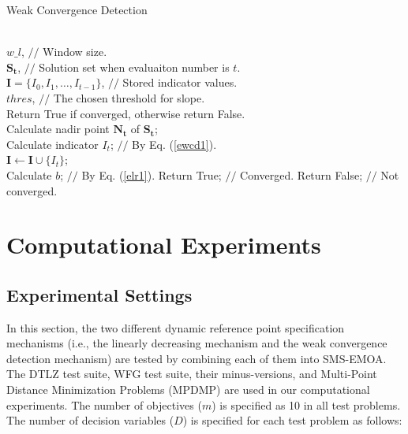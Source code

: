 \documentclass[conference]{IEEEtran}
\begin{document}
\begin{algorithm}
  \caption{Weak Convergence Detection}
  \label{alg:wcd}
  \begin{algorithmic}
  \REQUIRE ~~\\
    $w\_l$, $//$ Window size.\\
    $\boldsymbol{S_{t}}$, $//$ Solution set when evaluaiton number is $t$.\\
    $\boldsymbol I = \{I_{0},I_{1},\dots,I_{t-1}\}$, $//$ Stored indicator values. \\
    $thres$, $//$ The chosen threshold for slope. \\ 
  \ENSURE Return True if converged, otherwise return False.~~\\
    Calculate nadir point $\boldsymbol{N_{t}}$ of $\boldsymbol{S_{t}}$; \\
    Calculate indicator $I_{t}$; $//$ By Eq. (\ref{ewcd1}). \\
    $\boldsymbol I \gets \boldsymbol I \cup \{I_{t}\}$; \\
    \STATE Calculate $b$; $//$ By Eq. (\ref{elr1}).
      \STATE Return True; $//$ Converged.
      \ENDIF
    \ENDIF
    \STATE Return False; $//$ Not converged.
  \end{algorithmic}
\end{algorithm}
% 
% 
%
\section{Computational Experiments}
\subsection{Experimental Settings}
In this section, the two different dynamic reference point specification mechanisms 
(i.e., the linearly decreasing mechanism and the weak convergence detection mechanism) 
are tested by combining each of them into SMS-EMOA\cite{smsemoa}. 
The DTLZ test suite\cite{DTLZ}, WFG test suite\cite{WFG}, 
their minus-versions\cite{minusTestProblem}, 
and Multi-Point Distance Minimization Problems (MPDMP)\cite{dmp} are used in our computational experiments. 
The number of objectives ($m$) is specified as 10 in all test problems. 
The number of decision variables ($D$) is specified for each test problem as follows: 
\end{document}
